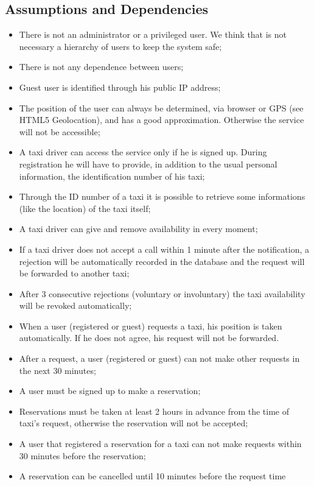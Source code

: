 	\subsection{Assumptions and Dependencies}
		\begin{itemize}
			\item There is not an administrator or a privileged user. We think that is not
			necessary a hierarchy of users to keep the system safe;
			\item There is not any dependence between users;
			\item Guest user is identified through his public IP address;
			\item The position of the user can always be determined, via browser or GPS
			(see HTML5 Geolocation), and has a good approximation. Otherwise the service will not
			be accessible;
			\item A taxi driver can access the service only if he is signed up. During
			registration he will have to provide, in addition to the usual personal information,
			the identification number of his taxi;
			\item Through the ID number of a taxi it is possible to retrieve some informations (like
			the location) of the taxi itself;
			\item A taxi driver can give and remove availability in every moment;
			\item If a taxi driver does not accept a call within 1 minute after the notification,
			a rejection will be automatically recorded in the database and the request will be
			forwarded to another taxi;
			\item After 3 consecutive rejections (voluntary or involuntary) the taxi availability
			will be revoked automatically;
			\item When a user (registered or guest) requests a taxi, his position is taken automatically.
			If he does not agree, his request will not be forwarded.
			\item After a request, a user (registered or guest) can not make other requests in the next 30 minutes;
			\item A user must be signed up to make a reservation;
			\item Reservations must be taken at least 2 hours in advance from the time of taxi's request,
			otherwise the reservation will not be accepted;
			\item A user that registered a reservation for a taxi can not make requests within 30 minutes
			before the reservation;
			\item A reservation can be cancelled until 10 minutes before the request time
		\end{itemize}
